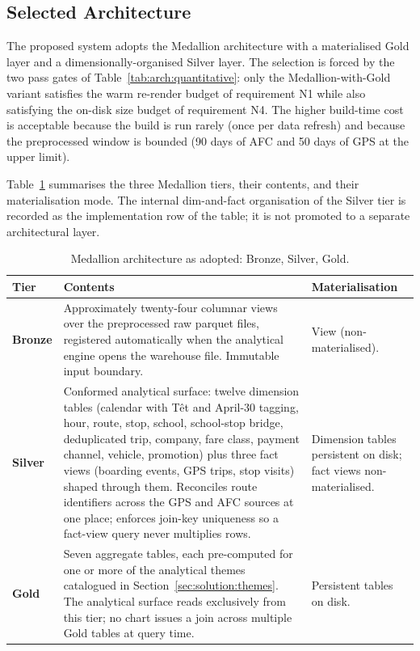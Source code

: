 \subsection{Selected Architecture}
\label{sec:solution:architecture:chosen}

The proposed system adopts the Medallion architecture with a
materialised Gold layer and a dimensionally-organised Silver layer.
The selection is forced by the two pass gates of
Table~\ref{tab:arch:quantitative}: only the Medallion-with-Gold
variant satisfies the warm re-render budget of requirement N1 while
also satisfying the on-disk size budget of requirement N4. The
higher build-time cost is acceptable because the build is run rarely
(once per data refresh) and because the preprocessed window is
bounded (90 days of AFC and 50 days of GPS at the upper limit).

Table~\ref{tab:arch:layers} summarises the three Medallion tiers,
their contents, and their materialisation mode. The internal
dim-and-fact organisation of the Silver tier is recorded as the
implementation row of the table; it is not promoted to a separate
architectural layer.

\begin{table}[!htbp]
  \centering
  \caption{Medallion architecture as adopted: Bronze, Silver, Gold.}
  \label{tab:arch:layers}
  \footnotesize
  \renewcommand{\arraystretch}{1.3}
  \begin{tabularx}{\linewidth}{p{2.4cm} X p{3.0cm}}
    \hline
    \textbf{Tier} & \textbf{Contents} & \textbf{Materialisation} \\
    \hline
    \textbf{Bronze}   & Approximately twenty-four columnar views over the preprocessed raw parquet files, registered automatically when the analytical engine opens the warehouse file. Immutable input boundary. & View (non-materialised). \\
    \textbf{Silver}   & Conformed analytical surface: twelve dimension tables (calendar with T\^et and April-30 tagging, hour, route, stop, school, school-stop bridge, deduplicated trip, company, fare class, payment channel, vehicle, promotion) plus three fact views (boarding events, GPS trips, stop visits) shaped through them. Reconciles route identifiers across the GPS and AFC sources at one place; enforces join-key uniqueness so a fact-view query never multiplies rows. & Dimension tables persistent on disk; fact views non-materialised. \\
    \textbf{Gold}     & Seven aggregate tables, each pre-computed for one or more of the analytical themes catalogued in Section~\ref{sec:solution:themes}. The analytical surface reads exclusively from this tier; no chart issues a join across multiple Gold tables at query time. & Persistent tables on disk. \\
    \hline
  \end{tabularx}
\end{table}

